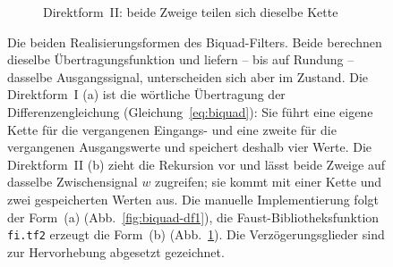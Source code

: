 \begin{figure}
\begin{subfigure}{\textwidth}
\caption{Direktform~II: beide Zweige teilen sich dieselbe Kette}
\label{fig:biquad-df2}
\end{subfigure}

\caption[Direktform I und II des Biquad-Filters]%
{Die beiden Realisierungsformen des Biquad-Filters. Beide berechnen
dieselbe \"Ubertragungsfunktion und liefern -- bis auf Rundung -- dasselbe
Ausgangssignal, unterscheiden sich aber im Zustand. Die Direktform~I (a) ist
die w\"ortliche \"Ubertragung der Differenzengleichung
(Gleichung~\ref{eq:biquad}): Sie f\"uhrt eine eigene Kette f\"ur die
vergangenen Eingangs- und eine zweite f\"ur die vergangenen Ausgangswerte und
speichert deshalb vier Werte. Die Direktform~II (b) zieht die Rekursion vor
und l\"asst beide Zweige auf dasselbe Zwischensignal $w$ zugreifen; sie
kommt mit einer Kette und zwei gespeicherten Werten aus. Die manuelle
Implementierung folgt der Form~(a) (Abb.~\ref{fig:biquad-df1}), die Faust-Bibliotheksfunktion
\texttt{fi.tf2} erzeugt die Form~(b)
(Abb.~\ref{fig:biquad-df2}). Die Verz\"ogerungsglieder sind zur
Hervorhebung abgesetzt gezeichnet.}
\label{fig:biquad-formen}
\end{figure}

